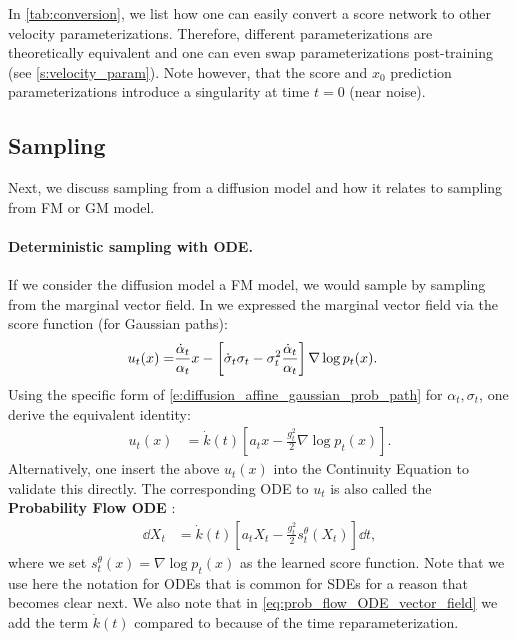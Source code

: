\documentclass{fairmeta}
\newcommand{\highlight}[1]{{\color{metablue} \textbf{#1}}}
\renewcommand{\eqref}[1]{\labelcref{#1}}
\numberwithin{equation}{section}
\begin{document}
In \cref{tab:conversion}, we list how one can easily convert a score network to other velocity parameterizations. Therefore, different parameterizations are theoretically equivalent and one can even swap parameterizations post-training (see \cref{s:velocity_param}). Note however, that the score and $x_0$ prediction parameterizations introduce a singularity at time $t=0$ (near noise).

\subsection{Sampling}
Next, we discuss sampling from a diffusion model and how it relates to sampling from FM or GM model.

\paragraph{Deterministic sampling with ODE.} If we consider the diffusion model a FM model, we would sample by sampling from the marginal vector field. In \eqref{e:u_t_score} we expressed the marginal vector field via the score function (for Gaussian paths): 
\begin{align}
    \label{eq:prob_flow_ODE_vector_field}
    u_t(x)
    =&
    \frac{\dot{\alpha}_t}{\alpha_t}x - \left [\dot{\sigma}_t\sigma_t - \sigma_t^2\frac{\dot{\alpha}_t}{\alpha_t}\right ]\nabla\log p_t(x).
\end{align}
Using the specific form of \cref{e:diffusion_affine_gaussian_prob_path} for $\alpha_t,\sigma_t$, one derive the equivalent identity:
\begin{align}
    u_t(x)&=\dot{k}(t)\left[a_{t}x - \frac{g_{t}^2}{2}\nabla\log p_t(x)\right].
\end{align}
Alternatively, one insert the above $u_t(x)$ into the Continuity Equation to validate this directly. The corresponding ODE to $u_t$ is also called the \highlight{Probability Flow ODE} \citep{song2021sde}: 
\begin{align}
    \dd X_t&=\dot{k}(t)\left[a_{t}X_t - \frac{g_{t}^2}{2}s_t^\theta(X_t)\right]\dd t,
\end{align}
where we set  $s^\theta_t(x)=\nabla \log p_t(x)$ as the learned score function. 
Note that we use here the notation for ODEs that is common for SDEs for a reason that becomes clear next. We also note that in \cref{eq:prob_flow_ODE_vector_field} we add the term $\dot{k}(t)$ compared to \citep{song2021sde} because of the time reparameterization.
\end{document}
